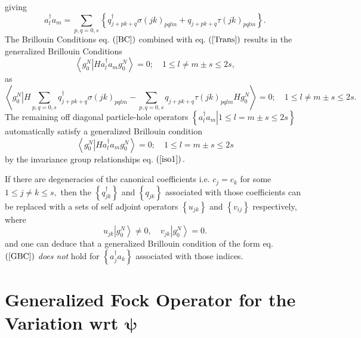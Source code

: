 \documentclass[aps,preprint]{revtex4}%
\begin{document}
giving
\begin{equation}
a_{l}^{\dagger}a_{m}=\sum_{p,q=0,s}\left\{  q_{j+pk+q}^{\dagger}\sigma\left(
jk\right)  _{pqlm}+q_{j+pk+q}\tau\left(  jk\right)  _{pqlm}\right\}  .
\label{Trans}%
\end{equation}
The Brillouin Conditions eq. $\left(  \ref{BC}\right)  $ combined with eq.
$\left(  \ref{Trans}\right)  $ results in the generalized Brillouin
Conditions
\begin{equation}
\left\langle \left.  g_{0}^{N}\right\vert Ha_{l}^{\dagger}a_{m}g_{0}%
^{N}\right\rangle =0;\quad1\leq l\neq m\pm s\leq2s, \label{GBC}%
\end{equation}
as%
\begin{equation}
\left\langle \left.  g_{0}^{N}\right\vert H\sum_{p,q=0,s}q_{j+pk+q}^{\dagger
}\sigma\left(  jk\right)  _{pqlm}-\sum_{p,q=0,s}q_{j+pk+q}\tau\left(
jk\right)  _{pqlm}Hg_{0}^{N}\right\rangle =0;\quad1\leq l\neq m\pm s\leq2s.
\end{equation}
The remaining off diagonal particle-hole operators $\left\{  \left.
a_{l}^{\dagger}a_{m}\right\vert 1\leq l=m\pm s\leq2s\right\}  $ automatically
satisfy a generalized Brillouin condition
\begin{equation}
\left\langle \left.  g_{0}^{N}\right\vert Ha_{l}^{\dagger}a_{m}g_{0}%
^{N}\right\rangle =0;\quad1\leq l=m\pm s\leq2s
\end{equation}
by the invariance group relationships eq. $\left(  \ref{iso1}\right)  .$

If there are degeneracies of the canonical coefficients i.e. $c_{j}=c_{k}$ for
some $1\leq j\neq k\leq s,$ then the $\left\{  q_{jk}^{\dagger}\right\}  $ and
$\left\{  q_{jk}\right\}  $ associated with those coefficients can be replaced
\cite{weiner2004}\cite{Goscinski82} with a sets of self adjoint operators
$\left\{  u_{jk}\right\}  $ and $\left\{  v_{ij}\right\}  $ respectively,
where
\begin{equation}
u_{jk}\left\vert g_{0}^{N}\right\rangle \neq0,\quad v_{jk}\left\vert g_{0}%
^{N}\right\rangle =0.
\end{equation}
and one can deduce that a generalized Brillouin condition of the form eq.
$\left(  \ref{GBC}\right)  $ \emph{does not} hold for $\left\{  a_{j}%
^{\dagger}a_{k}\right\}  $ associated with those indices.

\section{Generalized Fock Operator \label{Fock} for the Variation wrt
$\mathbf{\psi}$}
\end{document}
